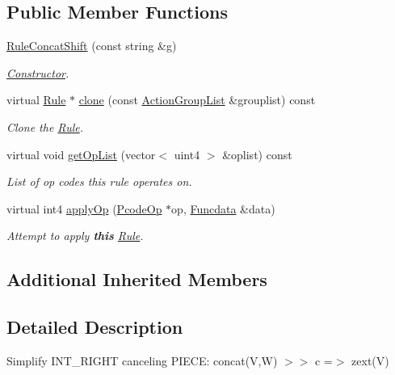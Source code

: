 \subsection*{Public Member Functions}
\begin{DoxyCompactItemize}
\item 
\mbox{\hyperlink{class_rule_concat_shift_a339294e9fbd2bbcf16cb8945f63e26cb}{Rule\+Concat\+Shift}} (const string \&g)
\begin{DoxyCompactList}\small\item\em \mbox{\hyperlink{class_constructor}{Constructor}}. \end{DoxyCompactList}\item 
virtual \mbox{\hyperlink{class_rule}{Rule}} $\ast$ \mbox{\hyperlink{class_rule_concat_shift_a61c36a17ec824709364df8a3fa9f8ce8}{clone}} (const \mbox{\hyperlink{class_action_group_list}{Action\+Group\+List}} \&grouplist) const
\begin{DoxyCompactList}\small\item\em Clone the \mbox{\hyperlink{class_rule}{Rule}}. \end{DoxyCompactList}\item 
virtual void \mbox{\hyperlink{class_rule_concat_shift_aed8199aa900381abf4df2e9ad708217b}{get\+Op\+List}} (vector$<$ uint4 $>$ \&oplist) const
\begin{DoxyCompactList}\small\item\em List of op codes this rule operates on. \end{DoxyCompactList}\item 
virtual int4 \mbox{\hyperlink{class_rule_concat_shift_a7954f9333718c1f1da94e117f1f5e9b1}{apply\+Op}} (\mbox{\hyperlink{class_pcode_op}{Pcode\+Op}} $\ast$op, \mbox{\hyperlink{class_funcdata}{Funcdata}} \&data)
\begin{DoxyCompactList}\small\item\em Attempt to apply {\bfseries{this}} \mbox{\hyperlink{class_rule}{Rule}}. \end{DoxyCompactList}\end{DoxyCompactItemize}
\subsection*{Additional Inherited Members}


\subsection{Detailed Description}
Simplify I\+N\+T\+\_\+\+R\+I\+G\+HT canceling P\+I\+E\+CE\+: {\ttfamily concat(\+V,\+W) $>$$>$ c =$>$ zext(\+V)} 

